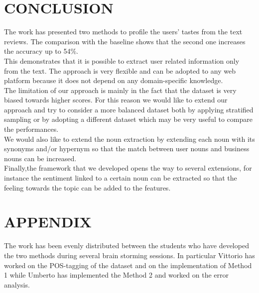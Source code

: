 \documentclass[11pt]{article}
\begin{document}
\section{CONCLUSION}
The work has presented two methods to profile the users' tastes from the text reviews. The comparison with the baseline shows that the second one increases the accuracy up to 54\%.\\
This demonstrates that it is possible to extract user related information only from the text. The approach is very flexible and can be adopted to any web platform because it does not depend on any domain-specific knowledge.\\
The limitation of our approach is mainly in the fact that the dataset is very biased towards higher scores. For this reason we would like to extend our approach and try to consider a more balanced dataset both by applying stratified sampling or by adopting a different dataset which may be very useful to compare the performances.\\
We would also like to extend the noun extraction by extending each noun with its synonyms and/or hypernym so that the match between user nouns and business nouns can be increased.\\
Finally,the framework that we developed opens the way to several extensions, for instance the sentiment linked to a certain noun can be extracted so that the feeling towards the topic can be added to the features.\\




\addtolength{\textheight}{-12cm}   %


\newpage
\section*{APPENDIX}
The work has been evenly distributed between the students who have developed the two methods during several brain storming sessions. In particular Vittorio has worked on the POS-tagging of the dataset and on the implementation of Method 1 while Umberto has implemented the Method 2 and worked on the error analysis.
\end{document}
